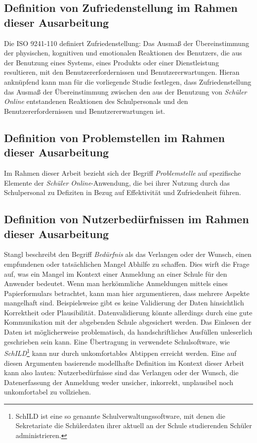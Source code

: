 \subsection{Definition von Zufriedenstellung im Rahmen dieser Ausarbeitung}
Die ISO 9241-110 definiert Zufriedenstellung: \glqq Das Ausmaß der Übereinstimmung der physischen, kognitiven und emotionalen Reaktionen des Benutzers, die aus der Benutzung eines Systems, eines Produkts oder einer Dienstleistung resultieren, mit den Benutzererfordernissen und Benutzererwartungen.\grqq{}\cite{ISO-9241-110} Hieran anknüpfend kann man für die vorliegende Studie festlegen, dass Zufriedenstellung das Ausmaß der Übereinstimmung zwischen den aus der Benutzung von \textit{Schüler Online} entstandenen Reaktionen des Schulpersonals und den Benutzererfordernissen und Benutzererwartungen ist. 

\subsection{Definition von Problemstellen im Rahmen dieser Ausarbeitung}
Im Rahmen dieser Arbeit bezieht sich der Begriff \textit{Problemstelle} auf spezifische Elemente der \textit{Schüler Online}-Anwendung, die bei ihrer Nutzung durch das Schulpersonal zu Defiziten in Bezug auf Effektivität und Zufriedenheit führen.

\subsection{Definition von Nutzerbedürfnissen im Rahmen dieser Ausarbeitung}
Stangl beschreibt den Begriff \textit{Bedürfnis} als \glqq das Verlangen oder der Wunsch, einen empfundenen oder tatsächlichen Mangel Abhilfe zu schaffen.\grqq{}\cite{stangl-beduerfnis} Dies wirft die Frage auf, was ein Mangel im Kontext einer Anmeldung an einer Schule für den Anwender bedeutet. Wenn man herkömmliche Anmeldungen mittels eines Papierformulars betrachtet, kann man hier argumentieren, dass mehrere Aspekte mangelhaft sind. Beispielsweise gibt es keine Validierung der Daten hinsichtlich Korrektheit oder Plausibilität.  Datenvalidierung könnte allerdings durch eine gute Kommunikation mit der abgebenden Schule abgesichert werden. Das Einlesen der Daten ist möglicherweise problematisch, da handschriftliches Ausfüllen unleserlich geschrieben sein kann. Eine Übertragung in verwendete Schulsoftware, wie \textit{SchILD}\footnote{SchILD ist eine so genannte Schulverwaltungssoftware, mit denen die Sekretariate die Schülerdaten ihrer aktuell an der Schule studierenden Schüler administrieren.} kann nur durch unkomfortables Abtippen erreicht werden.
Eine auf diesen Argumenten basierende modellhafte Definition im Kontext dieser Arbeit kann also lauten: \glqq Nutzerbedürfnisse sind das Verlangen oder der Wunsch, die Datenerfassung der Anmeldung weder unsicher, inkorrekt, unplausibel noch unkomfortabel zu vollziehen\grqq{}.

